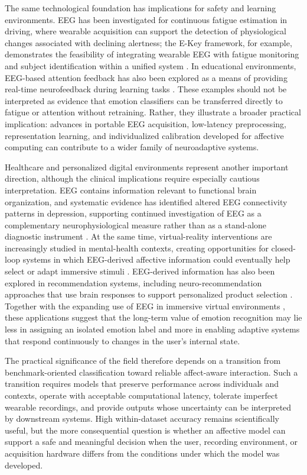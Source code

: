 \documentclass{WileyMSP-template}
\begin{document}
The same technological foundation has implications for safety and learning environments. EEG has been investigated for continuous fatigue estimation in driving, where wearable acquisition can support the detection of physiological changes associated with declining alertness; the E-Key framework, for example, demonstrates the feasibility of integrating wearable EEG with fatigue monitoring and subject identification within a unified system \cite{xu2023ekey}. In educational environments, EEG-based attention feedback has also been explored as a means of providing real-time neurofeedback during learning tasks \cite{sethi2018attentionfeedback}. These examples should not be interpreted as evidence that emotion classifiers can be transferred directly to fatigue or attention without retraining. Rather, they illustrate a broader practical implication: advances in portable EEG acquisition, low-latency preprocessing, representation learning, and individualized calibration developed for affective computing can contribute to a wider family of neuroadaptive systems.

Healthcare and personalized digital environments represent another important direction, although the clinical implications require especially cautious interpretation. EEG contains information relevant to functional brain organization, and systematic evidence has identified altered EEG connectivity patterns in depression, supporting continued investigation of EEG as a complementary neurophysiological measure rather than as a stand-alone diagnostic instrument \cite{miljevic2023depressionconnectivity}. At the same time, virtual-reality interventions are increasingly studied in mental-health contexts, creating opportunities for closed-loop systems in which EEG-derived affective information could eventually help select or adapt immersive stimuli \cite{lipira2023vrmentalhealth}. EEG-derived information has also been explored in recommendation systems, including neuro-recommendation approaches that use brain responses to support personalized product selection \cite{panda2024neurorecommendation}. Together with the expanding use of EEG in immersive virtual environments \cite{choi2023immersivevr}, these applications suggest that the long-term value of emotion recognition may lie less in assigning an isolated emotion label and more in enabling adaptive systems that respond continuously to changes in the user's internal state.

The practical significance of the field therefore depends on a transition from benchmark-oriented classification toward reliable affect-aware interaction. Such a transition requires models that preserve performance across individuals and contexts, operate with acceptable computational latency, tolerate imperfect wearable recordings, and provide outputs whose uncertainty can be interpreted by downstream systems. High within-dataset accuracy remains scientifically useful, but the more consequential question is whether an affective model can support a safe and meaningful decision when the user, recording environment, or acquisition hardware differs from the conditions under which the model was developed.
\end{document}
